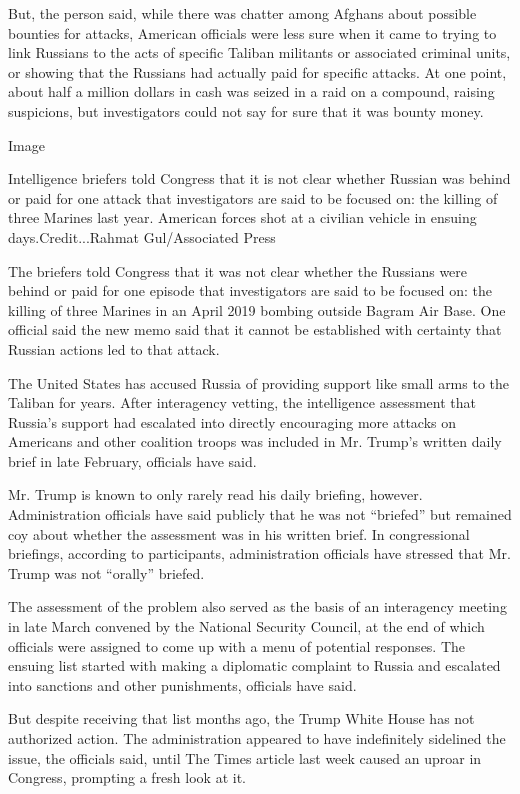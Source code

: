 But, the person said, while there was chatter among Afghans about
possible bounties for attacks, American officials were less sure when it
came to trying to link Russians to the acts of specific Taliban
militants or associated criminal units, or showing that the Russians had
actually paid for specific attacks. At one point, about half a million
dollars in cash was seized in a raid on a compound, raising suspicions,
but investigators could not say for sure that it was bounty money.

Image

Intelligence briefers told Congress that it is not clear whether Russian
was behind or paid for one attack that investigators are said to be
focused on: the killing of three Marines last year. American forces shot
at a civilian vehicle in ensuing days.Credit...Rahmat Gul/Associated
Press

The briefers told Congress that it was not clear whether the Russians
were behind or paid for one episode that investigators are said to be
focused on: the killing of three Marines in an April 2019 bombing
outside Bagram Air Base. One official said the new memo said that it
cannot be established with certainty that Russian actions led to that
attack.

The United States has accused Russia of providing support like small
arms to the Taliban for years. After interagency vetting, the
intelligence assessment that Russia's support had escalated into
directly encouraging more attacks on Americans and other coalition
troops was included in Mr. Trump's written daily brief in late February,
officials have said.

Mr. Trump is known to only rarely read his daily briefing, however.
Administration officials have said publicly that he was not ``briefed''
but remained coy about whether the assessment was in his written brief.
In congressional briefings, according to participants, administration
officials have stressed that Mr. Trump was not ``orally'' briefed.

The assessment of the problem also served as the basis of an interagency
meeting in late March convened by the National Security Council, at the
end of which officials were assigned to come up with a menu of potential
responses. The ensuing list started with making a diplomatic complaint
to Russia and escalated into sanctions and other punishments, officials
have said.

But despite receiving that list months ago, the Trump White House has
not authorized action. The administration appeared to have indefinitely
sidelined the issue, the officials said, until The Times article last
week caused an uproar in Congress, prompting a fresh look at it.

